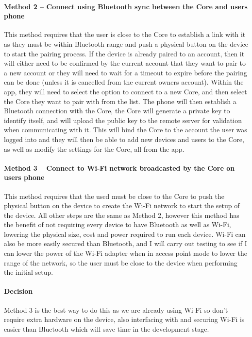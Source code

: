 \paragraph*{Method 2 – Connect using Bluetooth sync between the Core and users phone}
This method requires that the user is close to the Core to establish a link with it as they must be within Bluetooth range and push a physical button on the device to start the pairing process. If the device is already paired to an account, then it will either need to be confirmed by the current account that they want to pair to a new account or they will need to wait for a timeout to expire before the pairing can be done (unless it is cancelled from the current owners account). Within the app, they will need to select the option to connect to a new Core, and then select the Core they want to pair with from the list. The phone will then establish a Bluetooth connection with the Core, the Core will generate a private key to identify itself, and will upload the public key to the remote server for validation when communicating with it. This will bind the Core to the account the user was logged into and they will then be able to add new devices and users to the Core, as well as modify the settings for the Core, all from the app.

\paragraph*{Method 3 – Connect to Wi-Fi network broadcasted by the Core on users phone}
This method requires that the used must be close to the Core to push the physical button on the device to create the Wi-Fi network to start the setup of the device. All other steps are the same as Method 2, however this method has the benefit of not requiring every device to have Bluetooth as well as Wi-Fi, lowering the physical size, cost and power required to run each device. Wi-Fi can also be more easily secured than Bluetooth, and I will carry out testing to see if I can lower the power of the Wi-Fi adapter when in access point mode to lower the range of the network, so the user must be close to the device when performing the initial setup.

\paragraph*{Decision}
Method 3 is the best way to do this as we are already using Wi-Fi so don't require extra hardware on the device, also interfacing with and securing Wi-Fi is easier than Bluetooth which will save time in the development stage. 

